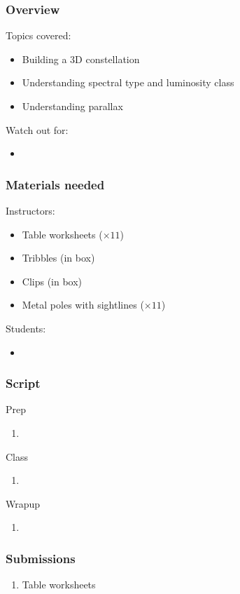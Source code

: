 \documentclass[12pt]{article}
\begin{document}
\subsubsection{Overview}
Topics covered:
\begin{itemize}
\item Building a 3D constellation
\item Understanding spectral type and luminosity class
\item Understanding parallax
\end{itemize}
Watch out for:
\begin{itemize}
\item 
\end{itemize}

\subsubsection{Materials needed}
Instructors:
\begin{itemize}
  \item Table worksheets ($\times 11$)
  \item Tribbles (in box)
  \item Clips (in box)
  \item Metal poles with sightlines ($\times 11$)
\end{itemize}
Students:
\begin{itemize}
  \item 
\end{itemize}

\subsubsection{Script}
Prep
\begin{enumerate}
\item
\end{enumerate}
Class
\begin{enumerate}
\item
\end{enumerate}
Wrapup
\begin{enumerate}
\item
\end{enumerate}

\subsubsection{Submissions}
\begin{enumerate}
    \item Table worksheets
\end{enumerate}
\end{document}
